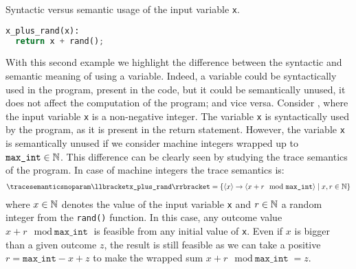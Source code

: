 \begin{example}
  \begin{marginlisting}
    \caption{Syntactic versus semantic usage of the input variable \texttt{x}.}
    \vspace{2\lineheight}
  \begin{lstlisting}[language=Python]
x_plus_rand(x):
  return x + rand();
\end{lstlisting}
  \end{marginlisting}
With this second example we highlight the difference between the syntactic and semantic meaning of using a variable. Indeed, a variable could be syntactically used in the program, \ie present in the code, but it could be semantically unused, \ie it does not affect the computation of the program; and vice versa.
Consider , where the input variable \texttt{x} is a non-negative integer.
The variable \texttt{x} is syntactically used by the program, as it is present in the return statement.
However, the variable \texttt{x} is semantically unused if we consider machine integers wrapped up to $\texttt{max\_int}\in\mathbb{N}$.
This difference can be clearly seen by studying the trace semantics of the program. In case of machine integers the trace semantics is:
\begin{align*}
  \tracesemanticsnoparam\semanticsof{\texttt{x\_plus\_rand}}
  =
  \setdef{
    \langle{x}\rangle\rightarrow\langle{x+r \mod \texttt{max\_int}}\rangle
  }{x, r \in \N}
\end{align*}
where $x\in\mathbb{N}$ denotes the value of the input variable \texttt{x} and $r\in\mathbb{N}$ a random integer from the \texttt{rand()} function.
In this case, any outcome value $x+r \mod \texttt{max\_int}$ is feasible from any initial value of \texttt{x}.
Even if $x$ is bigger than a given outcome $z$, the result is still feasible as we can take a positive $r = \texttt{max\_int} - x + z$ to make the wrapped sum $x + r \mod \texttt{max\_int} = z$.


\end{example}
